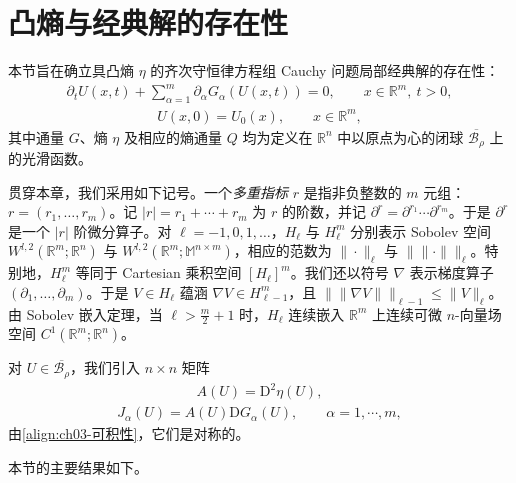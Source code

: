 \documentclass[../../main.tex]{subfiles}
\begin{document}
\section{凸熵与经典解的存在性}\label{section:ch05-凸熵与经典解的存在性}

本节旨在确立具凸熵 $\eta$ 的齐次守恒律方程组 Cauchy 问题局部经典解的存在性：
\begin{align}
\partial_{t}U(x,t)+\sum_{\alpha=1}^{m}\partial_{\alpha}G_{\alpha}(U(x,t))=0,\qquad x\in\mathbb{R}^{m},\ t>0,\label{align:ch05-cauchy-system}
\end{align}
\begin{align}
U(x,0)=U_{0}(x),\qquad x\in\mathbb{R}^{m},\label{align:ch05-cauchy-data}
\end{align}
其中通量 $G$、熵 $\eta$ 及相应的熵通量 $Q$ 均为定义在 $\mathbb{R}^{n}$ 中以原点为心的闭球 $\overline{\mathscr{B}_{\rho}}$ 上的光滑函数。

贯穿本章，我们采用如下记号。一个\emph{多重指标} $r$ 是指非负整数的 $m$ 元组：$r=(r_{1},\ldots,r_{m})$。记 $|r|=r_{1}+\cdots+r_{m}$ 为 $r$ 的阶数，并记 $\partial^{r}=\partial^{r_{1}}\cdots\partial^{r_{m}}$。于是 $\partial^{r}$ 是一个 $|r|$ 阶微分算子。对 $\ell=-1,0,1,\ldots$，$H_{\ell}$ 与 $H_{\ell}^{m}$ 分别表示 Sobolev 空间 $W^{l,2}(\mathbb{R}^{m};\mathbb{R}^{n})$ 与 $W^{l,2}(\mathbb{R}^{m};\mathbb{M}^{n\times m})$，相应的范数为 $\|\cdot\|_{\ell}$ 与 $\|\|\cdot\|\|_{\ell}$。特别地，$H_{\ell}^{m}$ 等同于 Cartesian 乘积空间 $[H_{\ell}]^{m}$。我们还以符号 $\nabla$ 表示梯度算子 $(\partial_{1},\ldots,\partial_{m})$。于是 $V\in H_{\ell}$ 蕴涵 $\nabla V\in H_{\ell-1}^{m}$，且 $\|\|\nabla V\|\|_{\ell-1}\leqslant\|V\|_{\ell}$。由 Sobolev 嵌入定理，当 $\ell>\frac{m}{2}+1$ 时，$H_{\ell}$ 连续嵌入 $\mathbb{R}^{m}$ 上连续可微 $n$-向量场空间 $C^{1}(\mathbb{R}^{m};\mathbb{R}^{n})$。

对 $U\in\overline{\mathscr{B}_{\rho}}$，我们引入 $n\times n$ 矩阵
\begin{align}
A(U)=\mathrm{D}^{2}\eta(U),\label{align:ch05-A-def}
\end{align}
\begin{align}
J_{\alpha}(U)=A(U)\mathrm{D}G_{\alpha}(U),\qquad\alpha=1,\cdots,m,\label{align:ch05-Jalpha-def}
\end{align}
由\eqref{align:ch03-可积性}，它们是对称的。

本节的主要结果如下。
\end{document}
